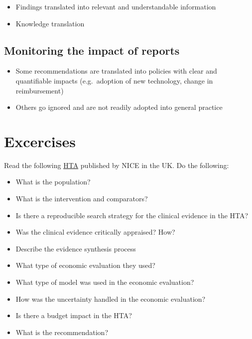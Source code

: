 \documentclass[
]{book}
\providecommand{\tightlist}{%
  \setlength{\itemsep}{0pt}\setlength{\parskip}{0pt}}
\begin{document}
\begin{itemize}
\tightlist
\item
  Findings translated into relevant and understandable information
\item
  Knowledge translation
\end{itemize}

\hypertarget{monitoring-the-impact-of-reports}{%
\subsection{Monitoring the impact of reports}\label{monitoring-the-impact-of-reports}}

\begin{itemize}
\tightlist
\item
  Some recommendations are translated into policies with clear and quantifiable impacts (e.g.~adoption of new technology, change in reimbursement)
\item
  Others go ignored and are not readily adopted into general practice
\end{itemize}

\hypertarget{excercises}{%
\section{Excercises}\label{excercises}}

Read the following \href{https://www.nice.org.uk/guidance/ta503/}{HTA} published by NICE in the UK. Do the following:

\begin{itemize}
\tightlist
\item
  What is the population?
\item
  What is the intervention and comparators?
\item
  Is there a reproducible search strategy for the clinical evidence in the HTA?
\item
  Was the clinical evidence critically appraised? How?
\item
  Describe the evidence synthesis process
\item
  What type of economic evaluation they used?
\item
  What type of model was used in the economic evaluation?
\item
  How was the uncertainty handled in the economic evaluation?
\item
  Is there a budget impact in the HTA?
\item
  What is the recommendation?
\end{itemize}
\end{document}
